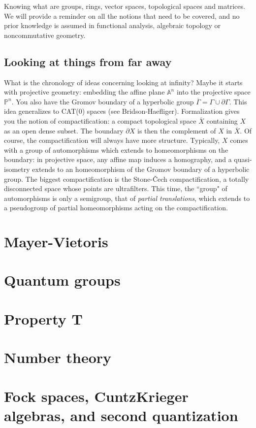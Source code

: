 Knowing what are groups, rings, vector spaces, topological spaces and matrices. We will provide a reminder on all the notions that need to be covered, and no prior knowledge is assumed in functional analysis, algebraic topology or noncommutative geometry.

\subsection*{Looking at things from far away}

What is the chronology of ideas concerning looking at infinity? Maybe it starts with projective geometry: embedding the affine plane $\mathbb A^n$ into the projective space $\mathbb P^n$. You also have the Gromov boundary of a hyperbolic group $\overline \Gamma = \Gamma \cup \partial \Gamma$. This idea generalizes to CAT(0) spaces (see Bridson-Haefliger). Formalization gives you the notion of compactification: a compact topological space $\overline X$ containing $X$ as an open dense subset. The boundary $\partial X$ is then the complement of $X$ in $\overline X$. Of course, the compactification will always have more structure. Typically, $X$ comes with a group of automorphisms which extends to homeomorphisms on the boundary: in projective space, any affine map induces a homography, and a quasi-isometry extends to an homeomorphism of the Gromov boundary of a hyperbolic group. The biggest compactification is the Stone-\v{C}ech compactification, a totally disconnected space whose points are ultrafilters. This time, the ``group" of automorphisms is only a semigroup, that of \textit{partial translations}, which extends to a pseudogroup of partial homeomorphisms acting on the compactification.   
\newpage

\section{Mayer-Vietoris}

\section{Quantum groups}

\section{Property T}

\section{Number theory}

\section{Fock spaces, CuntzKrieger algebras, and second quantization}












